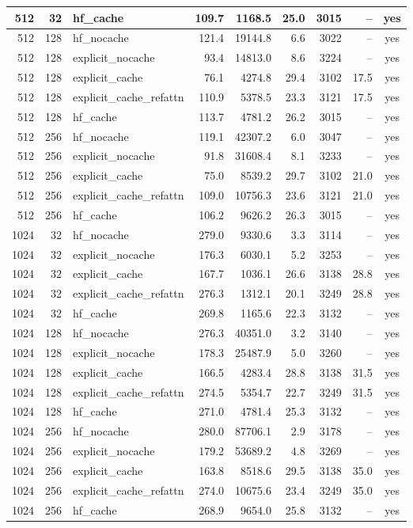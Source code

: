 \begin{table}[t]
\begin{tabular}{rrlrrrrrc}
512 & 32 & hf\_cache & 109.7 & 1168.5 & 25.0 & 3015 & -- & yes\\
\midrule
512 & 128 & hf\_nocache & 121.4 & 19144.8 & 6.6 & 3022 & -- & yes\\
512 & 128 & explicit\_nocache & 93.4 & 14813.0 & 8.6 & 3224 & -- & yes\\
512 & 128 & explicit\_cache & 76.1 & 4274.8 & 29.4 & 3102 & 17.5 & yes\\
512 & 128 & explicit\_cache\_refattn & 110.9 & 5378.5 & 23.3 & 3121 & 17.5 & yes\\
512 & 128 & hf\_cache & 113.7 & 4781.2 & 26.2 & 3015 & -- & yes\\
\midrule
512 & 256 & hf\_nocache & 119.1 & 42307.2 & 6.0 & 3047 & -- & yes\\
512 & 256 & explicit\_nocache & 91.8 & 31608.4 & 8.1 & 3233 & -- & yes\\
512 & 256 & explicit\_cache & 75.0 & 8539.2 & 29.7 & 3102 & 21.0 & yes\\
512 & 256 & explicit\_cache\_refattn & 109.0 & 10756.3 & 23.6 & 3121 & 21.0 & yes\\
512 & 256 & hf\_cache & 106.2 & 9626.2 & 26.3 & 3015 & -- & yes\\
\midrule
1024 & 32 & hf\_nocache & 279.0 & 9330.6 & 3.3 & 3114 & -- & yes\\
1024 & 32 & explicit\_nocache & 176.3 & 6030.1 & 5.2 & 3253 & -- & yes\\
1024 & 32 & explicit\_cache & 167.7 & 1036.1 & 26.6 & 3138 & 28.8 & yes\\
1024 & 32 & explicit\_cache\_refattn & 276.3 & 1312.1 & 20.1 & 3249 & 28.8 & yes\\
1024 & 32 & hf\_cache & 269.8 & 1165.6 & 22.3 & 3132 & -- & yes\\
\midrule
1024 & 128 & hf\_nocache & 276.3 & 40351.0 & 3.2 & 3140 & -- & yes\\
1024 & 128 & explicit\_nocache & 178.3 & 25487.9 & 5.0 & 3260 & -- & yes\\
1024 & 128 & explicit\_cache & 166.5 & 4283.4 & 28.8 & 3138 & 31.5 & yes\\
1024 & 128 & explicit\_cache\_refattn & 274.5 & 5354.7 & 22.7 & 3249 & 31.5 & yes\\
1024 & 128 & hf\_cache & 271.0 & 4781.4 & 25.3 & 3132 & -- & yes\\
\midrule
1024 & 256 & hf\_nocache & 280.0 & 87706.1 & 2.9 & 3178 & -- & yes\\
1024 & 256 & explicit\_nocache & 179.2 & 53689.2 & 4.8 & 3269 & -- & yes\\
1024 & 256 & explicit\_cache & 163.8 & 8518.6 & 29.5 & 3138 & 35.0 & yes\\
1024 & 256 & explicit\_cache\_refattn & 274.0 & 10675.6 & 23.4 & 3249 & 35.0 & yes\\
1024 & 256 & hf\_cache & 268.9 & 9654.0 & 25.8 & 3132 & -- & yes\\
\midrule
\bottomrule\end{tabular}\end{table}
